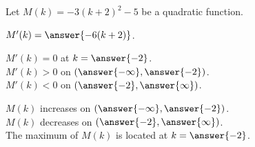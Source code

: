 \documentclass{ximera}
\author{Lee Wayand}
\begin{document}
\begin{exercise} 









Let $M(k) = -3(k+2)^2 - 5$ be a quadratic function. \\




\begin{question}



$M'(k) = \answer{-6(k+2)}$. \\

\end{question}






\begin{question}



$M'(k) = 0$  at  $k = \answer{-2}$. \\


$M'(k) > 0$ on $\left( \answer{-\infty}, \answer{-2} \right)$. \\


$M'(k) < 0$ on $\left( \answer{-2}, \answer{\infty} \right)$. \\

\end{question}





\begin{question}



$M(k)$ increases on $\left( \answer{-\infty}, \answer{-2} \right)$. \\


$M(k)$ decreases on $\left( \answer{-2}, \answer{\infty} \right)$. \\


The maximum of $M(k)$ is located at  $k = \answer{-2}$. \\

\end{question}
















\end{exercise}
\end{document}
